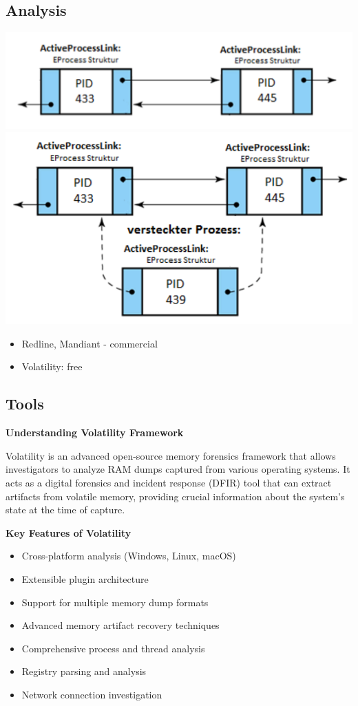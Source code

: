 \subsection{Analysis}
\begin{center}
  \includegraphics[width=\textwidth]{resources/13-volatility-process-list.png}
  \includegraphics[width=\textwidth]{resources/13-volatility-process-list-2.png}
\end{center}

\begin{itemize}
  \item Redline, Mandiant - commercial
  \item Volatility: free
\end{itemize}
\subsection{Tools}
\textbf{Understanding Volatility Framework}

Volatility is an advanced open-source memory forensics framework that allows investigators to analyze RAM dumps captured from various operating systems. It acts as a digital forensics and incident response (DFIR) tool that can extract artifacts from volatile memory, providing crucial information about the system's state at the time of capture.

\textbf{Key Features of Volatility}
\begin{itemize}
   \item Cross-platform analysis (Windows, Linux, macOS)
   \item Extensible plugin architecture
   \item Support for multiple memory dump formats
   \item Advanced memory artifact recovery techniques
   \item Comprehensive process and thread analysis
   \item Registry parsing and analysis
   \item Network connection investigation
\end{itemize}


